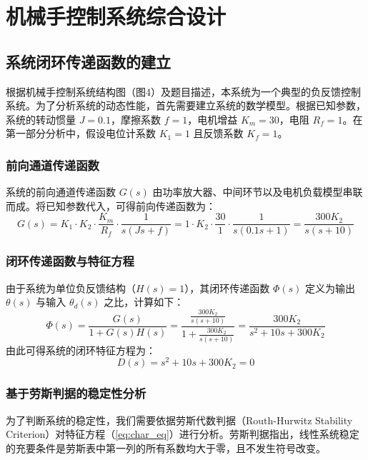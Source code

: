 \documentclass[a4paper,zihao=-4]{article}
\numberwithin{equation}{section}
\numberwithin{figure}{section}
\numberwithin{table}{section}
\begin{document}
	\section{机械手控制系统综合设计}
	\subsection{系统闭环传递函数的建立}
	
	根据机械手控制系统结构图（图4）及题目描述，本系统为一个典型的负反馈控制系统。为了分析系统的动态性能，首先需要建立系统的数学模型。根据已知参数，系统的转动惯量 $J=0.1$，摩擦系数 $f=1$，电机增益 $K_m=30$，电阻 $R_f=1$。在第一部分分析中，假设电位计系数 $K_1=1$ 且反馈系数 $K_f=1$。
	
	\subsubsection{前向通道传递函数}
	
	系统的前向通道传递函数 $G(s)$ 由功率放大器、中间环节以及电机负载模型串联而成。将已知参数代入，可得前向传递函数为：
	\begin{equation}
		G(s) = K_1 \cdot K_2 \cdot \frac{K_m}{R_f} \cdot \frac{1}{s(Js+f)} = 1 \cdot K_2 \cdot \frac{30}{1} \cdot \frac{1}{s(0.1s+1)} = \frac{300K_2}{s(s+10)}
	\end{equation}
	
	\subsubsection{闭环传递函数与特征方程}
	
	由于系统为单位负反馈结构（$H(s)=1$），其闭环传递函数 $\Phi(s)$ 定义为输出 $\theta(s)$ 与输入 $\theta_d(s)$ 之比，计算如下：
	\begin{equation}
		\Phi(s) = \frac{G(s)}{1+G(s)H(s)} = \frac{\frac{300K_2}{s(s+10)}}{1 + \frac{300K_2}{s(s+10)}} = \frac{300K_2}{s^2 + 10s + 300K_2}
	\end{equation}
	由此可得系统的闭环特征方程为：
	\begin{equation}
		D(s) = s^2 + 10s + 300K_2 = 0
		\label{eq:char_eq}
	\end{equation}
	
	\subsubsection{基于劳斯判据的稳定性分析}
	
	为了判断系统的稳定性，我们需要依据劳斯代数判据（Routh-Hurwitz Stability Criterion）对特征方程（\ref{eq:char_eq}）进行分析。劳斯判据指出，线性系统稳定的充要条件是劳斯表中第一列的所有系数均大于零，且不发生符号改变。
	
\end{document}
